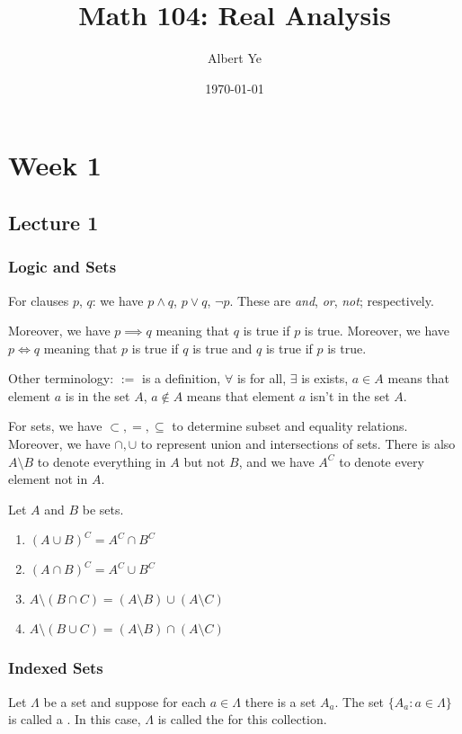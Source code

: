 \documentclass{book}
\title{Math 104: Real Analysis}
\author{Albert Ye}
\date{\today}
\begin{document}
\maketitle
\mytoc 
\chapter{Week 1}
\section{Lecture 1}
\subsection{Logic and Sets}
For clauses $p$, $q$: we have $p \land q$, $p \lor q$, $\lnot p$. These are \textit{and}, \textit{or}, \textit{not}; respectively. 

Moreover, we have $p \implies q$ meaning that $q$ is true if $p$ is true. Moreover, we have $p \iff q$ meaning that $p$ is true if $q$ is true and $q$ is true if $p$ is true.

Other terminology: $:=$ is a definition, $\forall$ is for all, $\exists$ is exists, $a \in A$ means that element $a$ is in the set $A$, $a \notin A$ means that element $a$ isn't in the set $A$.

For sets, we have $\subset, =, \subseteq$ to determine subset and equality relations. Moreover, we have $\cap, \cup$ to represent union and intersections of sets. There is also $A \setminus B$ to denote everything in $A$ but not $B$, and we have $A^C$ to denote every element not in $A$.

\begin{thm}
    Let $A$ and $B$ be sets. 
    \begin{enumerate}[label = (\alph*)]
        \item $(A \cup B)^C = A^C \cap B^C$
        \item $(A \cap B)^C = A^C \cup B^C$
        \item $A \setminus (B \cap C) = (A \setminus B) \cup (A \setminus C)$
        \item $A \setminus (B \cup C) = (A \setminus B) \cap (A \setminus C)$
    \end{enumerate}
\end{thm}

\subsection{Indexed Sets}
Let $\Lambda$ be a set and suppose for each $a \in \Lambda$ there is a set $A_a$. The set $\{A_a : a \in \Lambda\}$ is called a . In this case, $\Lambda$ is called the  for this collection.
\end{document}
